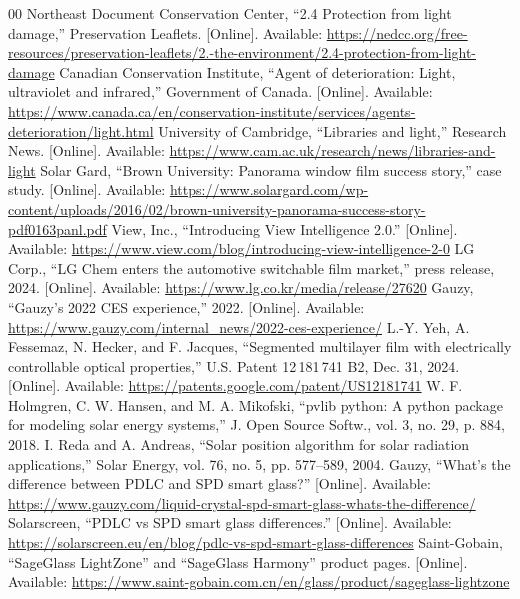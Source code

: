 \documentclass[conference]{IEEEtran}
\begin{document}
\begin{thebibliography}{00}
 Northeast Document Conservation Center, ``2.4 Protection from light damage,'' Preservation Leaflets. [Online]. Available: \url{https://nedcc.org/free-resources/preservation-leaflets/2.-the-environment/2.4-protection-from-light-damage}
 Canadian Conservation Institute, ``Agent of deterioration: Light, ultraviolet and infrared,'' Government of Canada. [Online]. Available: \url{https://www.canada.ca/en/conservation-institute/services/agents-deterioration/light.html}
 University of Cambridge, ``Libraries and light,'' Research News. [Online]. Available: \url{https://www.cam.ac.uk/research/news/libraries-and-light}
 Solar Gard, ``Brown University: Panorama window film success story,'' case study. [Online]. Available: \url{https://www.solargard.com/wp-content/uploads/2016/02/brown-university-panorama-success-story-pdf0163panl.pdf}
 View, Inc., ``Introducing View Intelligence 2.0.'' [Online]. Available: \url{https://www.view.com/blog/introducing-view-intelligence-2-0}
 LG Corp., ``LG Chem enters the automotive switchable film market,'' press release, 2024. [Online]. Available: \url{https://www.lg.co.kr/media/release/27620}
 Gauzy, ``Gauzy's 2022 CES experience,'' 2022. [Online]. Available: \url{https://www.gauzy.com/internal_news/2022-ces-experience/}
 L.-Y. Yeh, A. Fessemaz, N. Hecker, and F. Jacques, ``Segmented multilayer film with electrically controllable optical properties,'' U.S. Patent 12\,181\,741 B2, Dec. 31, 2024. [Online]. Available: \url{https://patents.google.com/patent/US12181741}
 W. F. Holmgren, C. W. Hansen, and M. A. Mikofski, ``pvlib python: A python package for modeling solar energy systems,'' J. Open Source Softw., vol. 3, no. 29, p. 884, 2018.
 I. Reda and A. Andreas, ``Solar position algorithm for solar radiation applications,'' Solar Energy, vol. 76, no. 5, pp. 577--589, 2004.
 Gauzy, ``What's the difference between PDLC and SPD smart glass?'' [Online]. Available: \url{https://www.gauzy.com/liquid-crystal-spd-smart-glass-whats-the-difference/}
 Solarscreen, ``PDLC vs SPD smart glass differences.'' [Online]. Available: \url{https://solarscreen.eu/en/blog/pdlc-vs-spd-smart-glass-differences}
 Saint-Gobain, ``SageGlass LightZone'' and ``SageGlass Harmony'' product pages. [Online]. Available: \url{https://www.saint-gobain.com.cn/en/glass/product/sageglass-lightzone}

\end{thebibliography}
\end{document}
